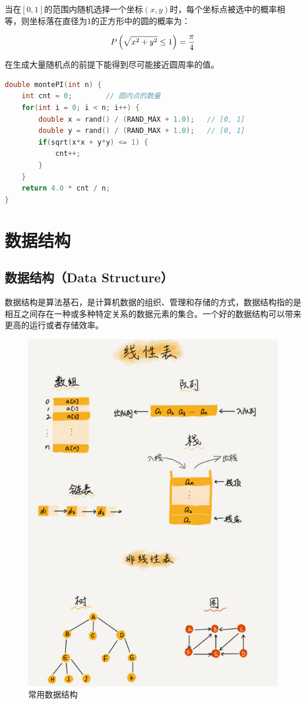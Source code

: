 当在$ [0, 1] $的范围内随机选择一个坐标$ (x, y) $时，每个坐标点被选中的概率相等，则坐标落在直径为1的正方形中的圆的概率为：

$$
	P \left( \sqrt{x^2 + y^2} \le 1 \right) = {\pi \over 4}
$$

在生成大量随机点的前提下能得到尽可能接近圆周率的值。 \\


\begin{lstlisting}[language=C]
double montePI(int n) {
	int cnt = 0;        // 圆内点的数量
	for(int i = 0; i < n; i++) {
		double x = rand() / (RAND_MAX + 1.0);   // [0, 1]
		double y = rand() / (RAND_MAX + 1.0);   // [0, 1]
		if(sqrt(x*x + y*y) <= 1) {
			cnt++;
		}
	}
	return 4.0 * cnt / n;
}
\end{lstlisting}

\newpage

\section{数据结构}

\subsection{数据结构（Data Structure）}

数据结构是算法基石，是计算机数据的组织、管理和存储的方式，数据结构指的是相互之间存在一种或多种特定关系的数据元素的集合。一个好的数据结构可以带来更高的运行或者存储效率。 \\

\begin{figure}[H]
	\centering
	\includegraphics[]{img/C1/1-4/1.png}
	\caption{常用数据结构}
\end{figure}

\newpage
